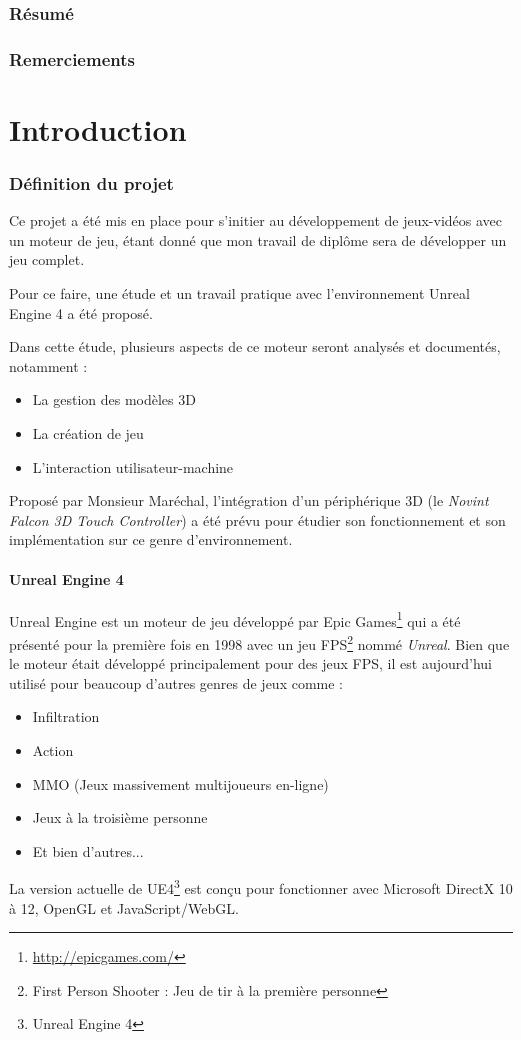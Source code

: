 \documentclass[11pt, a4paper, oneside]{article}
\begin{document}
\section{Résumé}
\section{Remerciements}
\newpage
\tableofcontents
\newpage
\part{Introduction}
\section{Définition du projet}
Ce projet a été mis en place pour s'initier au développement de jeux-vidéos avec un moteur de jeu, étant donné que mon travail de diplôme sera de développer un jeu complet.

Pour ce faire, une étude et un travail pratique avec l'environnement Unreal Engine 4 a été proposé.

Dans cette étude, plusieurs aspects de ce moteur seront analysés et documentés, notamment :
\begin{itemize}
\item La gestion des modèles 3D
\item La création de jeu
\item L'interaction utilisateur-machine\\
\end{itemize}
Proposé par Monsieur Maréchal, l'intégration d'un périphérique 3D (le \textit{Novint Falcon 3D Touch Controller}) a été prévu pour étudier son fonctionnement et son implémentation sur ce genre d'environnement.
\subsection{Unreal Engine 4}
\label{sec:ue4definition}
Unreal Engine est un moteur de jeu développé par Epic Games\footnote{\url{http://epicgames.com/}} qui a été présenté pour la première fois en 1998 avec un jeu FPS\footnote{First Person Shooter : Jeu de tir à la première personne} nommé \textit{Unreal}. Bien que le moteur était développé principalement pour des jeux FPS, il est aujourd'hui utilisé pour beaucoup d'autres genres de jeux comme :
\begin{itemize}
\item Infiltration
\item Action
\item MMO (Jeux massivement multijoueurs en-ligne)
\item Jeux à la troisième personne
\item Et bien d'autres...
\end{itemize}
La version actuelle de UE4\footnote{Unreal Engine 4} est conçu pour fonctionner avec Microsoft DirectX 10 à 12, OpenGL et JavaScript/WebGL.
\newpage
\end{document}
